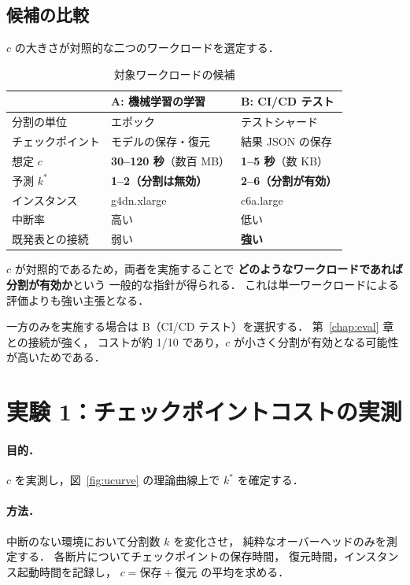 \documentclass[11pt,a4paper]{ltjsreport}
\begin{document}
\subsection{候補の比較}

$c$ の大きさが対照的な二つのワークロードを選定する．

\begin{table}[htbp]
\centering
\caption{対象ワークロードの候補}
\label{tab:usecases}
\small
\begin{tabularx}{\textwidth}{@{}lXX@{}}
\toprule
 & \textbf{A: 機械学習の学習} & \textbf{B: CI/CD テスト} \\
\midrule
分割の単位   & エポック & テストシャード \\
チェックポイント & モデルの保存・復元 & 結果 JSON の保存 \\
想定 $c$     & \textbf{30--120 秒}（数百 MB） & \textbf{1--5 秒}（数 KB） \\
予測 $k^{*}$ & \textbf{1--2（分割は無効）} & \textbf{2--6（分割が有効）} \\
インスタンス & g4dn.xlarge & c6a.large \\
中断率       & 高い & 低い \\
既発表との接続 & 弱い & \textbf{強い} \\
\bottomrule
\end{tabularx}
\end{table}

$c$ が対照的であるため，両者を実施することで
\textbf{どのようなワークロードであれば分割が有効か}という
一般的な指針が得られる．
これは単一ワークロードによる評価よりも強い主張となる．

一方のみを実施する場合は B（CI/CD テスト）を選択する．
第~\ref{chap:eval} 章との接続が強く，
コストが約 1/10 であり，$c$ が小さく分割が有効となる可能性が高いためである．

\section{実験 1：チェックポイントコストの実測}

\paragraph{目的．}
$c$ を実測し，図~\ref{fig:ucurve} の理論曲線上で
$k^{*}$ を確定する．

\paragraph{方法．}
中断のない環境において分割数 $k$ を変化させ，
純粋なオーバーヘッドのみを測定する．
各断片についてチェックポイントの保存時間，
復元時間，インスタンス起動時間を記録し，
$c = \text{保存} + \text{復元}$ の平均を求める．
\end{document}

